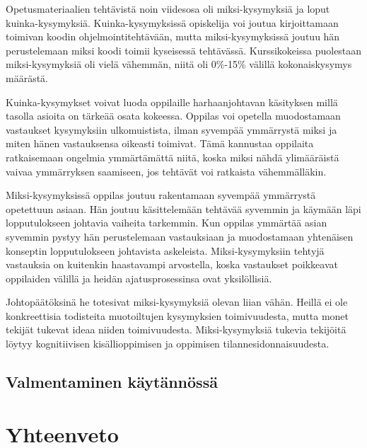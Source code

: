 \documentclass[finnish]{tktltiki2}
\theoremstyle{definition}
\theoremstyle{remark}
\begin{document}
Opetusmateriaalien tehtävistä noin viidesosa oli miksi-kysymyksiä ja loput kuinka-kysymyksiä. Kuinka-kysymyksissä opiskelija voi joutua kirjoittamaan toimivan koodin ohjelmointitehtävään, mutta miksi-kysymyksissä joutuu hän perustelemaan miksi koodi toimii kyseisessä tehtävässä. Kurssikokeissa puolestaan miksi-kysymyksiä oli vielä vähemmän, niitä oli 0\%-15\% välillä kokonaiskysymys määrästä. 

Kuinka-kysymykset voivat luoda oppilaille harhaanjohtavan käsityksen millä tasolla asioita on tärkeää osata kokeessa. Oppilas voi opetella  muodostamaan vastaukset kysymyksiin ulkomuistista, ilman syvempää ymmärrystä miksi ja miten hänen vastauksensa oikeasti toimivat. Tämä kannustaa oppilaita ratkaisemaan ongelmia ymmärtämättä niitä, koska miksi nähdä ylimääräistä vaivaa ymmärryksen saamiseen, jos tehtävät voi ratkaista vähemmälläkin.

Miksi-kysymyksissä oppilas joutuu rakentamaan syvempää ymmärrystä opetettuun asiaan. Hän joutuu käsittelemään tehtävää syvemmin ja käymään läpi lopputulokseen johtavia vaiheita tarkemmin. Kun oppilas ymmärtää asian syvemmin pystyy hän perustelemaan vastauksiaan ja muodostamaan yhtenäisen konseptin lopputulokseen johtavista askeleista. Miksi-kysymyksiin tehtyjä vastauksia on kuitenkin haastavampi arvostella, koska vastaukset poikkeavat oppilaiden välillä ja heidän ajatusprosessinsa ovat yksilöllisiä.

Johtopäätöksinä he totesivat miksi-kysymyksiä olevan liian vähän. Heillä ei ole konkreettisia todisteita muotoiltujen kysymyksien toimivuudesta, mutta monet tekijät tukevat ideaa niiden toimivuudesta. Miksi-kysymyksiä tukevia tekijöitä löytyy kognitiivisen kisällioppimisen ja oppimisen tilannesidonnaisuudesta.

\subsection{Valmentaminen käytännössä}



\section{Yhteenveto}


%
%
%

%
%
% 
%







% 
\end{document}
